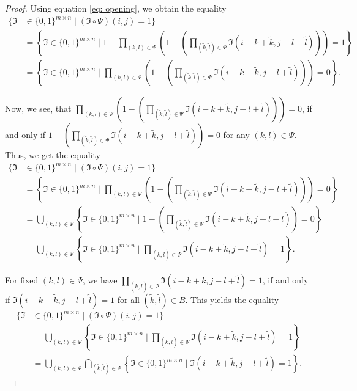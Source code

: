 \documentclass[a4paper,12pt]{article}
\theoremstyle{plain}
\theoremstyle{definition}
\begin{document}
\begin{proof}
	Using equation \eqref{eq: opening}, we obtain the equality
	\begin{align*}
		\big\{ \mathfrak{I} &\in \{ 0, 1 \}^{m \times n} \mid (\mathfrak{I} \circ \Psi)(i, j) = 1 \big\} \\
		&= \left\{ \mathfrak{I} \in \{ 0, 1 \}^{m \times n} \mid 1 - \prod_{(k, l) \in \Psi} \left( 1 - \left( \prod_{(\tilde{k}, \tilde{l}) \in \Psi} \mathfrak{I}(i - k + \tilde{k}, j - l + \tilde{l}) \right) \right) = 1 \right\} \\
		&= \left\{ \mathfrak{I} \in \{ 0, 1 \}^{m \times n} \mid \prod_{(k, l) \in \Psi} \left( 1 - \left( \prod_{(\tilde{k}, \tilde{l}) \in \Psi} \mathfrak{I}(i - k + \tilde{k}, j - l + \tilde{l}) \right) \right) = 0 \right\}.
	\end{align*}
	
	Now, we see, that $\prod_{(k, l) \in \Psi} \left( 1 - \left( \prod_{(\tilde{k}, \tilde{l}) \in \Psi} \mathfrak{I}(i - k + \tilde{k}, j - l + \tilde{l}) \right) \right) = 0$, if and only if $1 - \left( \prod_{(\tilde{k}, \tilde{l}) \in \Psi} \mathfrak{I}(i - k + \tilde{k}, j - l + \tilde{l}) \right) = 0$ for any $(k, l) \in \Psi$. Thus, we get the equality
	\begin{align*}
		\big\{ \mathfrak{I} &\in \{ 0, 1 \}^{m \times n} \mid (\mathfrak{I} \circ \Psi)(i, j) = 1 \big\} \\
		&= \left\{ \mathfrak{I} \in \{ 0, 1 \}^{m \times n} \mid \prod_{(k, l) \in \Psi} \left( 1 - \left( \prod_{(\tilde{k}, \tilde{l}) \in \Psi} \mathfrak{I}(i - k + \tilde{k}, j - l + \tilde{l}) \right) \right) = 0 \right\} \\
		&= \bigcup_{(k, l) \in \Psi} \left\{ \mathfrak{I} \in \{ 0, 1 \}^{m \times n} \mid 1 - \left( \prod_{(\tilde{k}, \tilde{l}) \in \Psi} \mathfrak{I}(i - k + \tilde{k}, j - l + \tilde{l}) \right) = 0 \right\} \\
		&= \bigcup_{(k, l) \in \Psi} \left\{ \mathfrak{I} \in \{ 0, 1 \}^{m \times n} \mid \prod_{(\tilde{k}, \tilde{l}) \in \Psi} \mathfrak{I}(i - k + \tilde{k}, j - l + \tilde{l}) = 1 \right\}.
	\end{align*}
	
	For fixed $(k, l) \in \Psi$, we have $\prod_{(\tilde{k}, \tilde{l}) \in \Psi} \mathfrak{I}(i - k + \tilde{k}, j - l + \tilde{l}) = 1$, if and only if $\mathfrak{I}(i - k + \tilde{k}, j - l + \tilde{l}) = 1$ for all $(\tilde{k}, \tilde{l}) \in B$. This yields the equality
	\begin{align*}
		\big\{ \mathfrak{I} &\in \{ 0, 1 \}^{m \times n} \mid (\mathfrak{I} \circ \Psi)(i, j) = 1 \big\} \\
		&= \bigcup_{(k, l) \in \Psi} \left\{ \mathfrak{I} \in \{ 0, 1 \}^{m \times n} \mid \prod_{(\tilde{k}, \tilde{l}) \in \Psi} \mathfrak{I}(i - k + \tilde{k}, j - l + \tilde{l}) = 1 \right\} \\
		&= \bigcup_{(k, l) \in \Psi} \bigcap_{(\tilde{k}, \tilde{l}) \in \Psi} \left\{ \mathfrak{I} \in \{ 0, 1 \}^{m \times n} \mid \mathfrak{I}(i - k + \tilde{k}, j - l + \tilde{l}) = 1 \right\}.
	\end{align*}
	

\end{proof}
\end{document}
